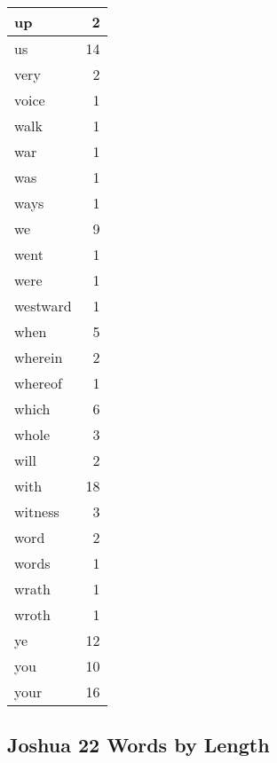 \begin{center}
\begin{longtable}{l|r}
up & 2\\ \hline 
us & 14\\ \hline 
very & 2\\ \hline 
voice & 1\\ \hline 
walk & 1\\ \hline 
war & 1\\ \hline 
was & 1\\ \hline 
ways & 1\\ \hline 
we & 9\\ \hline 
went & 1\\ \hline 
were & 1\\ \hline 
westward & 1\\ \hline 
when & 5\\ \hline 
wherein & 2\\ \hline 
whereof & 1\\ \hline 
which & 6\\ \hline 
whole & 3\\ \hline 
will & 2\\ \hline 
with & 18\\ \hline 
witness & 3\\ \hline 
word & 2\\ \hline 
words & 1\\ \hline 
wrath & 1\\ \hline 
wroth & 1\\ \hline 
ye & 12\\ \hline 
you & 10\\ \hline 
your & 16\\ \hline 
\end{longtable}
\end{center}





\subsection{Joshua 22 Words by Length}


\normalsize
 
